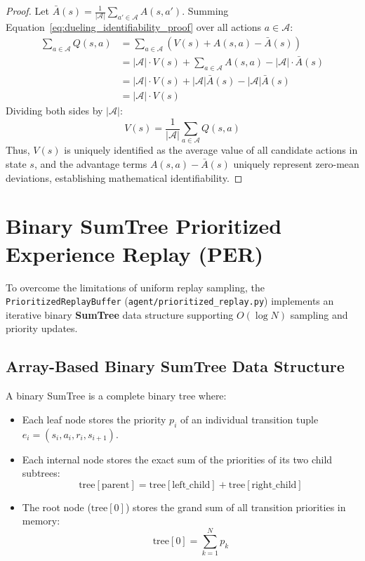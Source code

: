 \documentclass[12pt,a4paper,oneside]{report}
\begin{document}
\begin{proof}
Let $\bar{A}(s) = \frac{1}{|\mathcal{A}|} \sum_{a' \in \mathcal{A}} A(s, a')$. Summing Equation~\ref{eq:dueling_identifiability_proof} over all actions $a \in \mathcal{A}$:
\begin{align}
    \sum_{a \in \mathcal{A}} Q(s, a) &= \sum_{a \in \mathcal{A}} \left( V(s) + A(s, a) - \bar{A}(s) \right) \nonumber \\
    &= |\mathcal{A}| \cdot V(s) + \sum_{a \in \mathcal{A}} A(s, a) - |\mathcal{A}| \cdot \bar{A}(s) \nonumber \\
    &= |\mathcal{A}| \cdot V(s) + |\mathcal{A}| \bar{A}(s) - |\mathcal{A}| \bar{A}(s) \nonumber \\
    &= |\mathcal{A}| \cdot V(s)
\end{align}
Dividing both sides by $|\mathcal{A}|$:
\begin{equation}
    V(s) = \frac{1}{|\mathcal{A}|} \sum_{a \in \mathcal{A}} Q(s, a)
\end{equation}
Thus, $V(s)$ is uniquely identified as the average value of all candidate actions in state $s$, and the advantage terms $A(s, a) - \bar{A}(s)$ uniquely represent zero-mean deviations, establishing mathematical identifiability.
\end{proof}

\section{Binary SumTree Prioritized Experience Replay (PER)}
To overcome the limitations of uniform replay sampling, the \texttt{PrioritizedReplayBuffer} (\texttt{agent/prioritized\_replay.py}) implements an iterative binary \textbf{SumTree} data structure supporting $O(\log N)$ sampling and priority updates.

\subsection{Array-Based Binary SumTree Data Structure}
A binary SumTree is a complete binary tree where:
\begin{itemize}
    \item Each leaf node stores the priority $p_i$ of an individual transition tuple $e_i = (s_i, a_i, r_i, s_{i+1})$.
    \item Each internal node stores the exact sum of the priorities of its two child subtrees:
    \begin{equation}
        \text{tree}[\text{parent}] = \text{tree}[\text{left\_child}] + \text{tree}[\text{right\_child}]
    \end{equation}
    \item The root node ($\text{tree}[0]$) stores the grand sum of all transition priorities in memory:
    \begin{equation}
        \text{tree}[0] = \sum_{k=1}^N p_k
    \end{equation}
\end{itemize}
\end{document}
